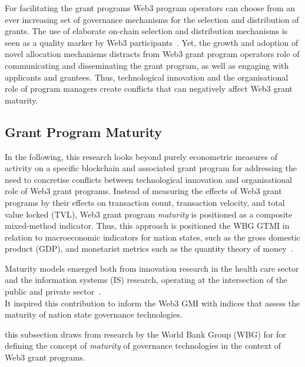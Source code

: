 \documentclass[conference]{IEEEtran}
\begin{document}
For facilitating the grant programs Web3 program operators can choose from an ever increasing set of governance mechanisms for the selection and distribution of grants. The use of elaborate on-chain selection and distribution mechanisms is seen as a quality marker by Web3 participants~\cite{owocki_gitcoin_2024}. Yet, the growth and adoption of novel allocation mechanisms distracts from Web3 grant program operators role of communicating and disseminating the grant program, as well as engaging with applicants and grantees. Thus, technological innovation and the organisational role of program managers create conflicts that can negatively affect Web3 grant maturity.

\subsection{Grant Program Maturity}

In the following, this research looks beyond purely econometric measures of activity on a specific blockchain and associated grant program for addressing the need to concretise conflicts between technological innovation and organisational role of Web3 grant programs. Instead of measuring the effects of Web3 grant programs by their effects on transaction count, transaction velocity, and total value locked (TVL), Web3 grant program \textit{maturity} is positioned as a composite mixed-method indicator. Thus, this approach is positioned the WBG GTMI in relation to macroeconomic indicators for nation states, such as the gross domestic product (GDP), and monetarist metrics such as the quantity theory of money~\cite{sun_understanding_2004}.

Maturity models emerged both from innovation research in the health care sector and the information systems (IS) research, operating at the intersection of the public and private sector~\cite{van_ede_assembling_2024,knosp_research_2018}.\\


 It inspired this contribution to inform the Web3 GMI with indices that assess the maturity of nation state governance technologies.

this subsection draws from research by the World Bank Group (WBG) for for defining the concept of \textit{maturity} of governance technologies in the context of Web3 grant programs.
\end{document}
